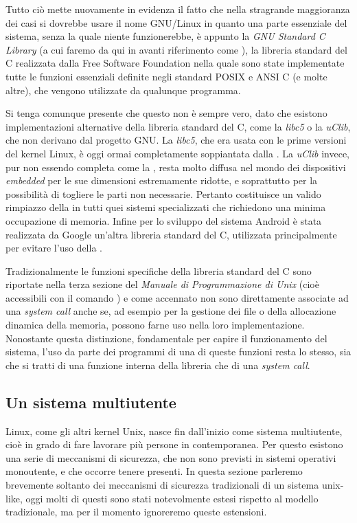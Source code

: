 Tutto ciò mette nuovamente in evidenza il fatto che nella stragrande
maggioranza dei casi si dovrebbe usare il nome GNU/Linux in quanto una parte
essenziale del sistema, senza la quale niente funzionerebbe, è appunto la
\textit{GNU Standard C Library} (a cui faremo da qui in avanti riferimento
come ), la libreria standard del C realizzata dalla Free Software
Foundation nella quale sono state implementate tutte le funzioni essenziali
definite negli standard POSIX e ANSI C (e molte altre), che vengono utilizzate
da qualunque programma.

Si tenga comunque presente che questo non è sempre vero, dato che esistono
implementazioni alternative della libreria standard del C, come la
\textit{libc5} o la \textit{uClib}, che non derivano dal progetto GNU. La
\textit{libc5}, che era usata con le prime versioni del kernel Linux, è oggi
ormai completamente soppiantata dalla . La \textit{uClib} invece,
pur non essendo completa come la , resta molto diffusa nel mondo
dei dispositivi \textit{embedded} per le sue dimensioni estremamente ridotte,
e soprattutto per la possibilità di togliere le parti non necessarie. Pertanto
costituisce un valido rimpiazzo della  in tutti quei sistemi
specializzati che richiedono una minima occupazione di memoria. Infine per lo
sviluppo del sistema Android è stata realizzata da Google un'altra libreria
standard del C, utilizzata principalmente per evitare l'uso della .

Tradizionalmente le funzioni specifiche della libreria standard del C sono
riportate nella terza sezione del \textsl{Manuale di Programmazione di Unix}
(cioè accessibili con il comando ) e come accennato non sono
direttamente associate ad una \textit{system call} anche se, ad esempio per la
gestione dei file o della allocazione dinamica della memoria, possono farne
uso nella loro implementazione.  Nonostante questa distinzione, fondamentale
per capire il funzionamento del sistema, l'uso da parte dei programmi di una
di queste funzioni resta lo stesso, sia che si tratti di una funzione interna
della libreria che di una \textit{system call}.


\subsection{Un sistema multiutente}
\label{sec:intro_multiuser}

Linux, come gli altri kernel Unix, nasce fin dall'inizio come sistema
multiutente, cioè in grado di fare lavorare più persone in contemporanea. Per
questo esistono una serie di meccanismi di sicurezza, che non sono previsti in
sistemi operativi monoutente, e che occorre tenere presenti. In questa sezione
parleremo brevemente soltanto dei meccanismi di sicurezza tradizionali di un
sistema unix-like, oggi molti di questi sono stati notevolmente estesi
rispetto al modello tradizionale, ma per il momento ignoreremo queste
estensioni.

